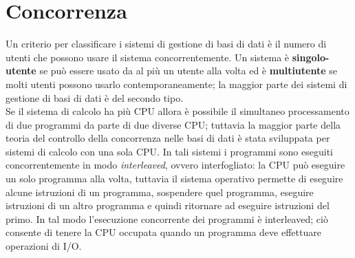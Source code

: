\section{Concorrenza}

Un criterio per classificare i sistemi di gestione di basi di dati è il numero di utenti che possono
usare il sistema concorrentemente. Un sistema è \textbf{singolo-utente} se può essere usato da al più un
utente alla volta ed è \textbf{multiutente} se molti utenti possono usarlo contemporaneamente; la maggior
parte dei sistemi di gestione di basi di dati è del secondo tipo.\\
Se il sistema di calcolo ha più CPU allora è possibile il simultaneo processamento di due
programmi da parte di due diverse CPU; tuttavia la maggior parte della teoria del controllo della
concorrenza nelle basi di dati è stata sviluppata per sistemi di calcolo con una sola CPU. In tali
sistemi i programmi sono eseguiti concorrentemente in modo \emph{interleaved}, ovvero interfogliato: la CPU
può eseguire un solo programma alla volta, tuttavia il sistema operativo permette di eseguire alcune
istruzioni di un programma, sospendere quel programma, eseguire istruzioni di un altro programma
e quindi ritornare ad eseguire istruzioni del primo. In tal modo l'esecuzione concorrente dei
programmi è interleaved; ciò consente di tenere la CPU occupata quando un programma deve
effettuare operazioni di I/O.\\
